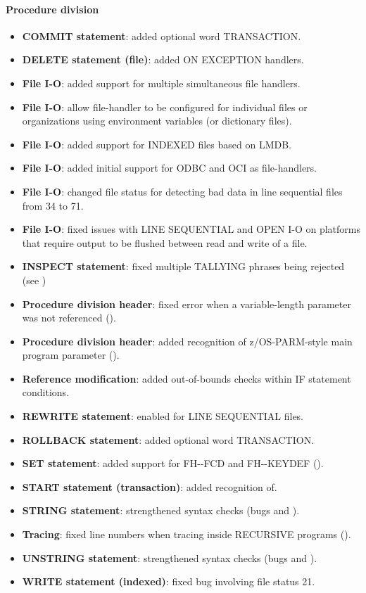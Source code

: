 \paragraph{Procedure division}
\begin{itemize}
\item \textbf{COMMIT statement}: added optional word TRANSACTION.
\item \textbf{DELETE statement (file)}: added ON EXCEPTION handlers.
\item \textbf{File I-O}: added support for multiple simultaneous file handlers.
\item \textbf{File I-O}: allow file-handler to be configured for individual files or organizations using environment variables (or dictionary files).
\item \textbf{File I-O}: added support for INDEXED files based on LMDB.
\item \textbf{File I-O}: added initial support for ODBC and OCI as file-handlers.
\item \textbf{File I-O}: changed file status for detecting bad data in line sequential files from 34 to 71.
\item \textbf{File I-O}: fixed issues with LINE SEQUENTIAL and OPEN I-O on platforms that require output to be flushed between read and write of a file.
\item \textbf{INSPECT statement}: fixed multiple TALLYING phrases being rejected (see )
\item \textbf{Procedure division header}: fixed error when a variable-length parameter was not referenced ().
\item \textbf{Procedure division header}: added recognition of z/OS-PARM-style main program parameter ().
\item \textbf{Reference modification}: added out-of-bounds checks within IF statement conditions.
\item \textbf{REWRITE statement}: enabled for LINE SEQUENTIAL files.
\item \textbf{ROLLBACK statement}: added optional word TRANSACTION.
\item \textbf{SET statement}: added support for FH-{}-FCD and FH-{}-KEYDEF ().
\item \textbf{START statement (transaction)}: added recognition of.
\item \textbf{STRING statement}: strengthened syntax checks (bugs  and ).
\item \textbf{Tracing}: fixed line numbers when tracing inside RECURSIVE programs ().
\item \textbf{UNSTRING statement}: strengthened syntax checks (bugs  and ).
\item \textbf{WRITE statement (indexed)}: fixed bug involving file status 21.
\end{itemize}

